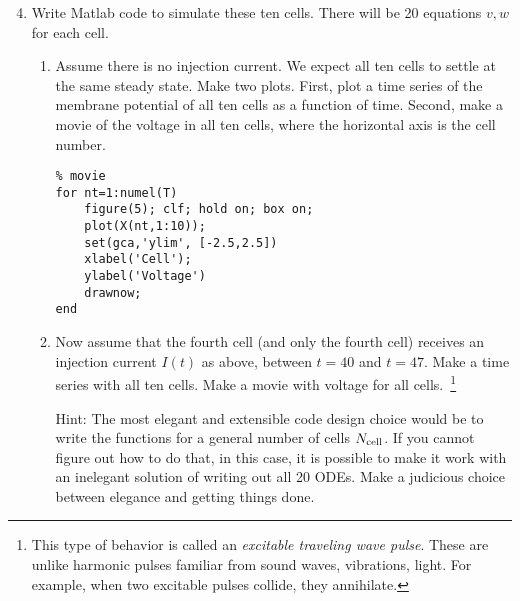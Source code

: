 \documentclass{exam}
\begin{document}
\begin{enumerate}
\setcounter{enumi}{3}
\item Write Matlab code to simulate these ten cells. There will be 20 equations $v,w$ for each cell. 
\begin{enumerate}
\item Assume there is no injection current. We expect all ten cells to settle at the same steady state. Make two plots. First, plot a time series of the membrane potential of all ten cells as a function of time. Second, make a movie of the voltage in all ten cells, where the horizontal axis is the cell number. 
\begin{lstlisting}
% movie
for nt=1:numel(T)
    figure(5); clf; hold on; box on;
    plot(X(nt,1:10)); 
    set(gca,'ylim', [-2.5,2.5])
    xlabel('Cell');
    ylabel('Voltage')
    drawnow;
end
\end{lstlisting}

\item Now assume that the fourth cell (and only the fourth cell) receives an injection current $I(t)$ as above, between $t=40$ and $t=47$. Make a time series with all ten cells. Make a movie with voltage for all cells.~\footnote{This type of behavior  is called an \emph{excitable traveling wave pulse}. These are unlike harmonic pulses familiar from sound waves, vibrations, light. For example, when two excitable pulses collide, they annihilate.}

Hint: The most elegant and extensible code design choice would be to write the functions for a general number of cells $N_{\rm cell}$. If you cannot figure out how to do that, in this case, it is possible to make it work with an inelegant solution of writing out all 20 ODEs. Make a judicious choice between elegance and getting things done.
\end{enumerate}
\end{enumerate}





  
\end{document}

